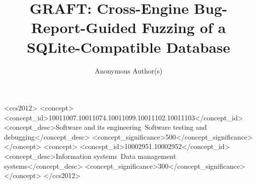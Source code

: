 \documentclass[acmsmall,screen,review,anonymous]{acmart}
\begin{document}
\title[GRAFT]{GRAFT: Cross-Engine Bug-Report-Guided Fuzzing of a SQLite-Compatible Database}

\author{Anonymous Author(s)}

\begin{abstract}

\end{abstract}

\begin{CCSXML}
<ccs2012>
  <concept>
    <concept_id>10011007.10011074.10011099.10011102.10011103</concept_id>
    <concept_desc>Software and its engineering~Software testing and debugging</concept_desc>
    <concept_significance>500</concept_significance>
  </concept>
  <concept>
    <concept_id>10002951.10002952</concept_id>
    <concept_desc>Information systems~Data management systems</concept_desc>
    <concept_significance>300</concept_significance>
  </concept>
</ccs2012>
\end{CCSXML}


\maketitle






\end{document}
